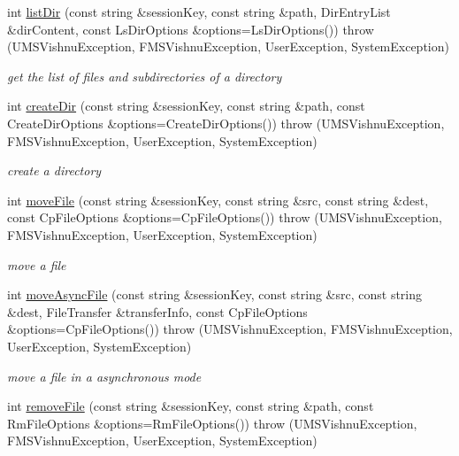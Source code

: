 \begin{DoxyCompactItemize}
int \hyperlink{namespacevishnu_a37f564b7b023409e54c4893e53e00602}{listDir} (const string \&sessionKey, const string \&path, DirEntryList \&dirContent, const LsDirOptions \&options=LsDirOptions())  throw (UMSVishnuException, FMSVishnuException, UserException, SystemException)
\begin{DoxyCompactList}\small\item\em get the list of files and subdirectories of a directory \item\end{DoxyCompactList}\item 
int \hyperlink{namespacevishnu_af022c7861b9e2a8f9705c71f0e78b077}{createDir} (const string \&sessionKey, const string \&path, const CreateDirOptions \&options=CreateDirOptions())  throw (UMSVishnuException, FMSVishnuException, UserException, SystemException)
\begin{DoxyCompactList}\small\item\em create a directory \item\end{DoxyCompactList}\item 
int \hyperlink{namespacevishnu_aab0a15fe913c3cfb7f1ba8416b21f116}{moveFile} (const string \&sessionKey, const string \&src, const string \&dest, const CpFileOptions \&options=CpFileOptions())  throw (UMSVishnuException, FMSVishnuException, UserException, SystemException)
\begin{DoxyCompactList}\small\item\em move a file \item\end{DoxyCompactList}\item 
int \hyperlink{namespacevishnu_a1611f0d2a0056ab1c373211a5911b669}{moveAsyncFile} (const string \&sessionKey, const string \&src, const string \&dest, FileTransfer \&transferInfo, const CpFileOptions \&options=CpFileOptions())  throw (UMSVishnuException, FMSVishnuException, UserException, SystemException)
\begin{DoxyCompactList}\small\item\em move a file in a asynchronous mode \item\end{DoxyCompactList}\item 
int \hyperlink{namespacevishnu_aa524b5e536bf51e3ac68ec06ee429691}{removeFile} (const string \&sessionKey, const string \&path, const RmFileOptions \&options=RmFileOptions())  throw (UMSVishnuException, FMSVishnuException, UserException, SystemException)
\item 

\end{DoxyCompactItemize}

